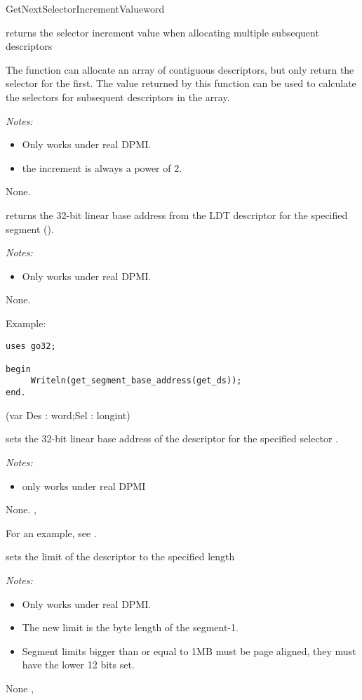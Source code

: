 {GetNextSelectorIncrementValue}{word}
{ returns the selector increment 
value when allocating multiple subsequent descriptors

The function  can allocate an array of
contiguous descriptors, but only return the selector for the first. The
value returned by this function can be used to calculate the selectors
for subsequent descriptors in the array.

{\em Notes:}
\begin{itemize}
\item Only works under real DPMI.
\item the increment is always a power of 2.
\end{itemize}
}
{None.}
{}

{
 returns the 32-bit linear base address 
from the LDT descriptor for the specified segment ().


{\em Notes:}
\begin{itemize}
\item Only works under real DPMI.
\end{itemize}
}
{None.}
{}

\begin{FPKList}
\item[Example:]
\begin{verbatim}
uses go32;

begin
     Writeln(get_segment_base_address(get_ds));
end.
\end{verbatim}
\end{FPKList}

{(var Des : word;Sel : longint)}
{ sets the 32-bit linear base address 
of the descriptor  for the specified selector .

{\em Notes:}
\begin{itemize}
\item only works under real DPMI
\end{itemize}
}
{None.}
{ , }

For an example, see .

{ sets the limit of the descriptor  
to the specified length 

{\em Notes:}
\begin{itemize}
\item Only works under real DPMI.
\item The new limit is the byte length of the segment-1.
\item Segment limits bigger than or equal to 1MB must be page aligned, they
must have the lower 12 bits set.
\end{itemize}
}
{None}
{ , }

